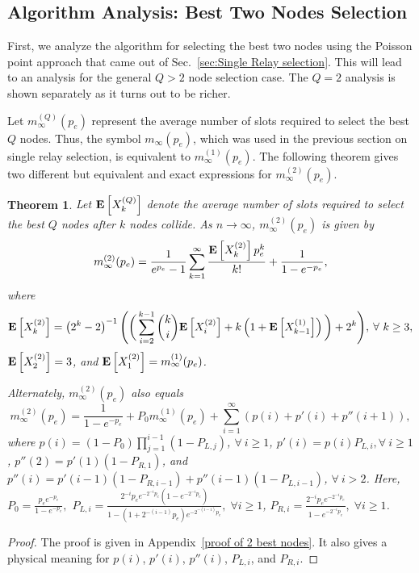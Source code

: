 \documentclass[12pt,draftcls,peerreview, onecolumn]{IEEEtran}
\newtheorem{theorem}{{\bf Theorem}}
\newcommand{\expect}[1]{{\bf E}\left[{#1}\right]}
\newcommand{\EXQ}[2]{\expect{X_{#1}^{(#2)}}}
\newcommand{\aveslotsQ}[2]{m_{#1}^{(#2)}}
\newcommand{\aveslots}[1]{m_{#1}}
\newcommand{\PLi}[1]{P_{L,#1}}
\newcommand{\PRi}[1]{P_{R,#1}}
\begin{document}
\subsection{Algorithm Analysis:  Best Two Nodes Selection}

First, we analyze the algorithm for selecting the best two nodes using
the Poisson point approach that came out of Sec.~\ref{sec:Single Relay
  selection}.  This will lead to an analysis for the general $Q > 2$
node selection case. The $Q = 2$ analysis is shown separately as it
turns out to be richer.

Let $\aveslotsQ{\infty}{Q}(p_e)$ represent the average number of slots
required to select the best $Q$ nodes. Thus, the symbol
$\aveslots{\infty}(p_e)$, which was used in the previous section on
single relay selection, is equivalent to $\aveslotsQ{\infty}{1}(p_e)$.
The following theorem gives two different but equivalent and exact
expressions for $\aveslotsQ{\infty}{2}(p_e)$.
\begin{theorem}
\label{2 best nodes}
Let $\EXQ{k}{Q}$ denote the average number of slots required to select
the best $Q$ nodes after $k$ nodes collide. As $n\to \infty$,
$\aveslotsQ{\infty}{2}(p_e)$ is given by
\begin{equation}\label{aveslots2}
\aveslotsQ{\infty}{2}(p_e) =\frac{1}{e^{p_e}-1} \sum_{k=1}^\infty \frac{\EXQ{k}{2}p_e^k}{k!}  + \frac{1}{1-e^{-p_e}},
 \end{equation}
where
\begin{equation}
\label{EX_k[2]}
 \EXQ{k}{2}=
\left(2^{k}-2\right)^{-1}\Bigg(\bigg(\sum_{i=2}^{k-1} \binom{k}{i}\EXQ{i}{2} + k\left(1+\EXQ{k-1}{1}\right) \bigg)+2^k\Bigg), \: \forall~k \ge 3,
\end{equation}
 $ \EXQ{2}{2}=3$, and $\EXQ{1}{2}=\aveslotsQ{\infty}{1}(p_e)$.

Alternately, $\aveslotsQ{\infty}{2}(p_e)$ also equals \begin{equation}
\aveslotsQ{\infty}{2}(p_e)=\frac{1}{1-e^{-p_e}}  + P_0\aveslotsQ{\infty}{1}(p_e) + \sum_{i=1}^\infty \left( p(i)+p'(i)+p''(i+1)\right),
\label{aveslots2_2}
 \end{equation}
 where
$p(i)= (1-P_0)\prod_{j=1}^{i-1} (1-\PLi{j})$, $\forall~i\ge1$,
$p'(i)=p(i)\PLi{i},\forall~i\ge1$,
 $p''(2)=p'(1)(1-\PRi{1})$, and $p''(i)=p'(i-1)(1-\PRi{i-1})+p''(i-1)(1-\PLi{i-1})$, $\forall~i>2$.
Here, $P_0=\frac{p_e e^{-p_e }}{1-e^{-p_e }},$
$ \PLi{i}=\frac{2^{-i}p_ee^{-2^{-i}p_e}(1-e^{-2^{-i}p_e})}{1-(1+2^{-(i-1)}p_e)e^{-2^{-(i-1)}p_e}}, \;\forall i\ge 1$,
$ \PRi{i}=\frac{2^{-i}p_ee^{-2^{-i}p_e}}{1-e^{-2^{-i}p_e}}, \;\forall i\ge 1$.
\end{theorem}
\begin{proof}
The proof is given in Appendix~\ref{proof of 2 best nodes}. It also
  gives a physical meaning for $p(i)$, $p'(i)$, $p''(i)$, $\PLi{i}$,
  and $\PRi{i}$.
\end{proof}
\end{document}
